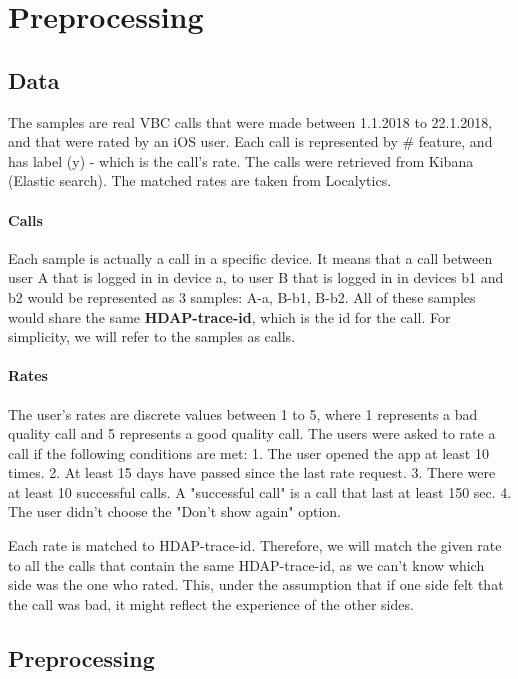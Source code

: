 
\section{Preprocessing}

\subsection{Data}

The samples are real VBC calls that were made between 1.1.2018 to 22.1.2018, and that were rated by an iOS user. Each call is represented by # feature, and has label (y) - which is the call's rate. The calls were retrieved from Kibana (Elastic search). The matched rates are taken from Localytics.

\paragraph{Calls}\label{Rates}
Each sample is actually a call in a specific device. It means that a call between user A that is logged in in device a, to user B that is logged in in devices b1 and b2 would be represented as 3 samples: A-a, B-b1, B-b2. All of these samples would share the same \textbf{HDAP-trace-id}, which is the id for the call. For simplicity, we will refer to the samples as calls.

\paragraph{Rates}\label{Rates}

The user's rates are discrete values between 1 to 5, where 1 represents a bad quality call and 5 represents a good quality call. The users were asked to rate a call if the following conditions are met:
1. The user opened the app at least 10 times.
2. At least 15 days have passed since the last rate request.
3. There were at least 10 successful calls. A "successful call" is a call that last at least 150 sec.
4. The user didn't choose the "Don't show again" option.

Each rate is matched to HDAP-trace-id. Therefore, we will match the given rate to all the calls that contain the same HDAP-trace-id, as we can't know which side was the one who rated. This, under the assumption that if one side felt that the call was bad, it might reflect the experience of the other sides.

\subsection{Preprocessing}

